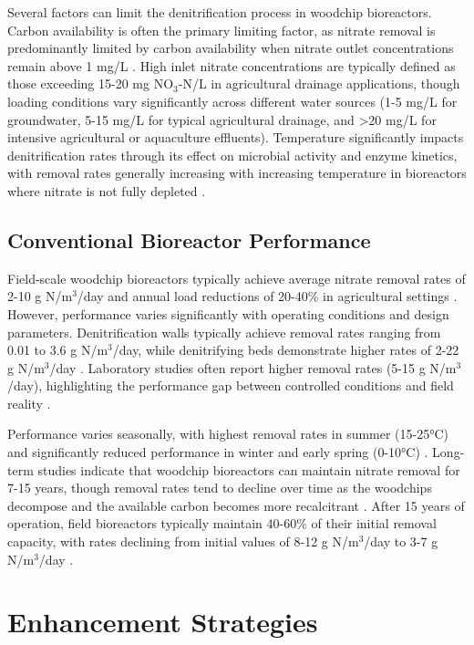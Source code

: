 \documentclass[12pt,a4paper]{article}
\begin{document}
Several factors can limit the denitrification process in woodchip bioreactors. Carbon availability is often the primary limiting factor, as nitrate removal is predominantly limited by carbon availability when nitrate outlet concentrations remain above 1 mg/L \citep{RN629, RN242}. High inlet nitrate concentrations are typically defined as those exceeding 15-20 mg NO$_3$-N/L in agricultural drainage applications, though loading conditions vary significantly across different water sources (1-5 mg/L for groundwater, 5-15 mg/L for typical agricultural drainage, and >20 mg/L for intensive agricultural or aquaculture effluents). Temperature significantly impacts denitrification rates through its effect on microbial activity and enzyme kinetics, with removal rates generally increasing with increasing temperature in bioreactors where nitrate is not fully depleted \citep{RN625, RN228, RN258}.

\subsection{Conventional Bioreactor Performance}

Field-scale woodchip bioreactors typically achieve average nitrate removal rates of 2-10 g N/m$^3$/day and annual load reductions of 20-40\% in agricultural settings \citep{RN312, RN310}. However, performance varies significantly with operating conditions and design parameters. Denitrification walls typically achieve removal rates ranging from 0.01 to 3.6 g N/m$^3$/day, while denitrifying beds demonstrate higher rates of 2-22 g N/m$^3$/day \citep{RN625, RN629}. Laboratory studies often report higher removal rates (5-15 g N/m$^3$/day), highlighting the performance gap between controlled conditions and field reality \citep{RN611}.

Performance varies seasonally, with highest removal rates in summer (15-25°C) and significantly reduced performance in winter and early spring (0-10°C) \citep{RN214, RN228, RN258}. Long-term studies indicate that woodchip bioreactors can maintain nitrate removal for 7-15 years, though removal rates tend to decline over time as the woodchips decompose and the available carbon becomes more recalcitrant \citep{RN629, RN958}. After 15 years of operation, field bioreactors typically maintain 40-60\% of their initial removal capacity, with rates declining from initial values of 8-12 g N/m$^3$/day to 3-7 g N/m$^3$/day \citep{RN958}.

\section{Enhancement Strategies}
\end{document}
